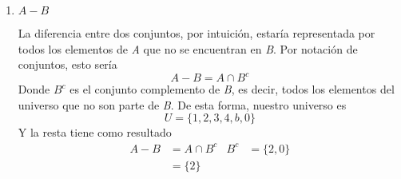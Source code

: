 \begin{enumerate}
	\item $A - B$
	
	La diferencia entre dos conjuntos, por intuici\'on, estar\'ia representada por todos los elementos de \textit{A} que no se encuentran en \textit{B}. Por notaci\'on de conjuntos, esto ser\'ia
	\begin{equation}
		A - B = A \cap B^c
	\end{equation}
	Donde $B^c$ es el conjunto complemento de \textit{B}, es decir, todos los elementos del universo que no son parte de \textit{B}. De esta forma, nuestro universo es $$U = \{1, 2, 3, 4, b, 0\}$$ Y la resta tiene como resultado
	\begin{align*}
		A - B &= A\cap B^c & B^c &= \{2, 0\}\\
		&= \{2\}
	\end{align*}
\end{enumerate}